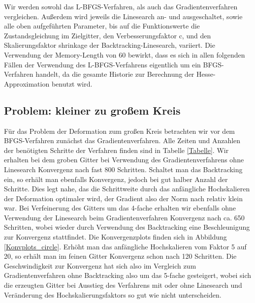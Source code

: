 Wir werden sowohl das L-BFGS-Verfahren, als auch das Gradientenverfahren vergleichen. Außerdem wird jeweils die Linesearch an- und ausgeschaltet, sowie alle oben aufgeführten Parameter, bis auf die Funktionswerte die Zustandsgleichung im Zielgitter, den Verbesserungsfaktor \textsf{c}, und den Skalierungsfaktor \textsf{shrinkage} der Backtracking-Linesearch, variiert. Die Verwendung der Memory-Length von 60 bewirkt, dass es sich in allen folgenden Fällen der Verwendung des L-BFGS-Verfahrens eigentlich um ein BFGS-Verfahren handelt, da die gesamte Historie zur Berechnung der Hesse-Approximation benutzt wird. 

\subsection{Problem: kleiner zu großem Kreis}\label{subsect_circle}

Für das Problem der Deformation zum großen Kreis betrachten wir vor dem BFGS-Verfahren zunächst das Gradientenverfahren. Alle Zeiten und Anzahlen der benötigten Schritte der Verfahren finden sind in Tabelle \ref{Tabelle}. Wir erhalten bei dem groben Gitter 
bei Verwendung des Gradientenverfahrens ohne Linesearch Konvergenz nach fast 800 Schritten. Schaltet man das Backtracking ein, so erhält man ebenfalls Konvergenz, jedoch bei gut halber Anzahl der Schritte. Dies legt nahe, das die Schrittweite durch das anfängliche Hochskalieren der Deformation optimaler wird, der Gradient also der Norm nach relativ klein war. Bei Verfeinerung des Gitters um das 4-fache erhalten wir ebenfalls ohne Verwendung der Linesearch beim Gradientenverfahren Konvergenz nach ca. 650 Schritten, wobei wieder durch Verwendung des Backtracking eine Beschleunigung zur Konvergenz stattfindet. Die Konvergenzplots finden sich in Abbildung \ref{Konvplots_circle}. Erhöht man das anfängliche Hochskalieren vom Faktor 5 auf 20, so erhält man im feinen Gitter Konvergenz schon nach 120 Schritten. Die Geschwindigkeit zur Konvergenz hat sich also im Vergleich zum Gradientenverfahren ohne Backtracking also um das 5-fache gesteigert, wobei sich die erzeugten Gitter bei Ausstieg des Verfahrens mit oder ohne Linesearch und Veränderung des Hochskalierungsfaktors so gut wie nicht unterscheiden. 

